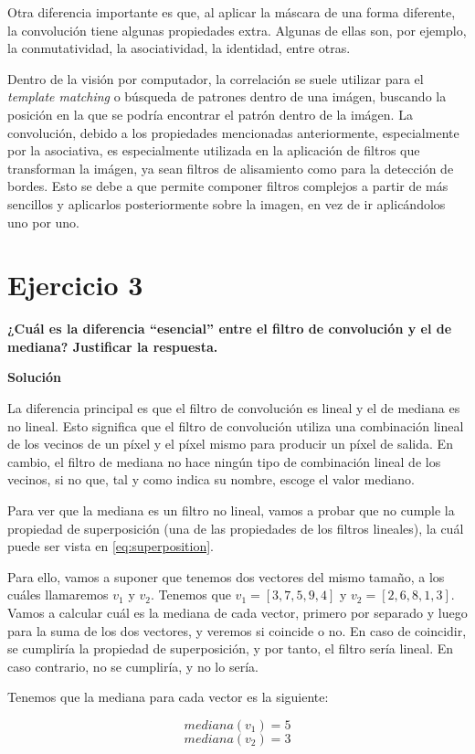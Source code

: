 \documentclass[11pt,a4paper]{article}
\newcommand{\answer}{\noindent\textbf{Solución}}
\newcommand{\question}[1]{\noindent\textbf{#1}}
\newcommand{\nonumbersection}[1]{\section*{#1}\addcontentsline{toc}{section}{#1}}
\begin{document}
Otra diferencia importante es que, al aplicar la máscara de una forma diferente, la convolución tiene algunas propiedades
extra. Algunas de ellas son, por ejemplo, la conmutatividad, la asociatividad, la identidad, entre otras.

Dentro de la visión por computador, la correlación se suele utilizar para el \textit{template matching} o búsqueda de patrones
dentro de una imágen, buscando la posición en la que se podría encontrar el patrón dentro de la imágen. La convolución,
debido a los propiedades mencionadas anteriormente, especialmente por la asociativa, es especialmente
utilizada en la aplicación de filtros que transforman la imágen, ya sean filtros de alisamiento como para la detección de bordes.
Esto se debe a que permite componer filtros complejos a partir de más sencillos y aplicarlos posteriormente sobre la imagen,
en vez de ir aplicándolos uno por uno.

\nonumbersection{Ejercicio 3}

\question{¿Cuál es la diferencia ``esencial'' entre el filtro de convolución y el de mediana? Justificar la respuesta.}

\answer

La diferencia principal es que el filtro de convolución es lineal y el de mediana es no lineal. Esto significa que el filtro
de convolución utiliza una combinación lineal de los vecinos de un píxel y el píxel mismo para producir un píxel de salida.
En cambio, el filtro de mediana no hace ningún tipo de combinación lineal de los vecinos, si no que, tal y como indica su
nombre, escoge el valor mediano.

Para ver que la mediana es un filtro no lineal, vamos a probar que no cumple la propiedad de superposición (una de las propiedades
de los filtros lineales), la cuál puede ser vista en \eqref{eq:superposition}.

Para ello, vamos a suponer que tenemos dos vectores del mismo tamaño, a los cuáles llamaremos $v_1$ y $v_2$. Tenemos que
$v_1 = [3, 7, 5, 9, 4]$ y $v_2 = [2, 6, 8, 1, 3]$. Vamos a calcular cuál es la mediana de cada vector, primero por
separado y luego para la suma de los dos vectores, y veremos si coincide o no. En caso de coincidir, se cumpliría la
propiedad de superposición, y por tanto, el filtro sería lineal. En caso contrario, no se cumpliría, y no lo sería.

Tenemos que la mediana para cada vector es la siguiente:

\[mediana(v_1) = 5 \]
\[mediana(v_2) = 3 \]
\end{document}
